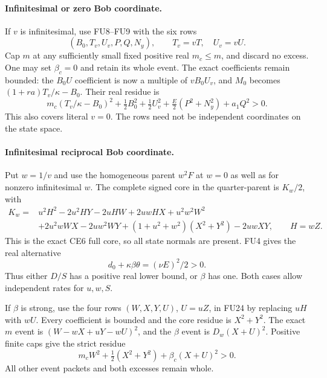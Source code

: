 \paragraph{Infinitesimal or zero Bob coordinate.}
If $v$ is infinitesimal, use FU8--FU9 with the six rows
\[
 (B_0,T_v,U_v,P,Q,N_y),\qquad T_v=vT,\quad U_v=vU.
 \tag{FU22}
\]
Cap $m$ at any sufficiently small fixed positive real $m_c\le m$,
and discard no excess. One may set $\beta_c=0$ and retain its
whole event. The exact coefficients remain bounded: the $B_0U$
coefficient is now a multiple of $vB_0U_v$, and $M_0$ becomes
$(1+ra)T_v/\kappa-B_0$. Their real residue is
\[
 m_c(T_v/\kappa-B_0)^2+\tfrac12B_0^2+\tfrac12U_v^2
                      +\tfrac E2(P^2+N_y^2)+a_1Q^2>0.
 \tag{FU23}
\]
This also covers literal $v=0$. The rows need not be independent
coordinates on the state space.

\paragraph{Infinitesimal reciprocal Bob coordinate.}
Put $w=1/v$ and use the homogeneous parent $w^2F$ at $w=0$ as
well as for nonzero infinitesimal $w$. The complete signed core
in the quarter-parent is $K_w/2$, with
\[
\begin{split}
 K_w={}&u^2H^2-2u^2HY-2uHW+2uwHX+u^2w^2W^2\\
 &+2u^2wWX-2uw^2WY+(1+u^2+w^2)(X^2+Y^2)-2uwXY,
 \qquad H=wZ.
\end{split}\tag{FU24}
\]
This is the exact CE6 full core, so all state normals are present.
FU4 gives the real alternative
\[
 d_0+\kappa\beta\theta=(\nu E)^2/2>0.
 \tag{FU25}
\]
Thus either $D/S$ has a positive real lower bound, or $\beta$
has one. Both cases allow independent rates for $u,w,S$.

If $\beta$ is strong, use the four rows $(W,X,Y,U)$, $U=uZ$,
in FU24 by replacing $uH$ with $wU$. Every coefficient is bounded
and the core residue is $X^2+Y^2$. The exact $m$ event is
$(W-wX+uY-wU)^2$, and the $\beta$ event is
$D_w(X+U)^2$. Positive finite caps give the strict residue
\[
 m_cW^2+\tfrac12(X^2+Y^2)+\beta_c(X+U)^2>0.
 \tag{FU26}
\]
All other event packets and both excesses remain whole.

